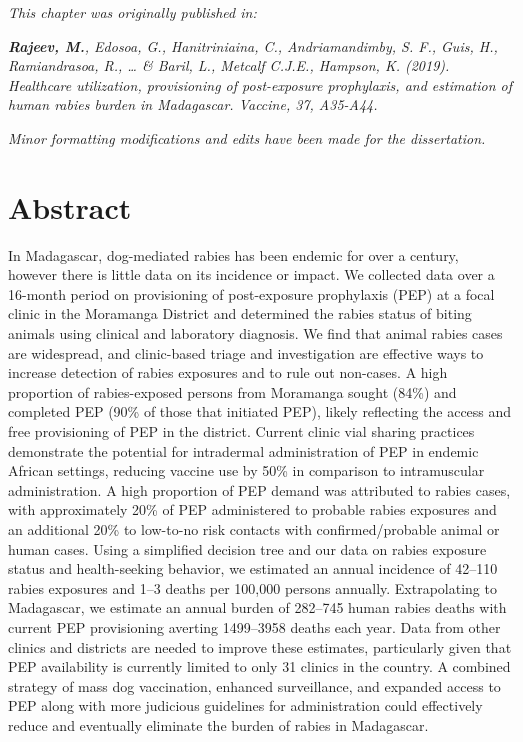 \documentclass[
  oneside]{book}
\begin{document}
\emph{This chapter was originally published in:}

\emph{\textbf{Rajeev, M.}, Edosoa, G., Hanitriniaina, C., Andriamandimby, S. F., Guis, H., Ramiandrasoa, R., \ldots{} \& Baril, L., Metcalf C.J.E., Hampson, K. (2019). Healthcare utilization, provisioning of post-exposure prophylaxis, and estimation of human rabies burden in Madagascar. Vaccine, 37, A35-A44.}

\emph{Minor formatting modifications and edits have been made for the dissertation.}

\newpage

\setlength{\parskip}{2em}

\hypertarget{abstract}{%
\section*{Abstract}\label{abstract}}

In Madagascar, dog-mediated rabies has been endemic for over a century, however there is little data on its incidence or impact. We collected data over a 16-month period on provisioning of post-exposure prophylaxis (PEP) at a focal clinic in the Moramanga District and determined the rabies status of biting animals using clinical and laboratory diagnosis. We find that animal rabies cases are widespread, and clinic-based triage and investigation are effective ways to increase detection of rabies exposures and to rule out non-cases. A high proportion of rabies-exposed persons from Moramanga sought (84\%) and completed PEP (90\% of those that initiated PEP), likely reflecting the access and free provisioning of PEP in the district. Current clinic vial sharing practices demonstrate the potential for intradermal administration of PEP in endemic African settings, reducing vaccine use by 50\% in comparison to intramuscular administration. A high proportion of PEP demand was attributed to rabies cases, with approximately 20\% of PEP administered to probable rabies exposures and an additional 20\% to low-to-no risk contacts with confirmed/probable animal or human cases. Using a simplified decision tree and our data on rabies exposure status and health-seeking behavior, we estimated an annual incidence of 42--110 rabies exposures and 1--3 deaths per 100,000 persons annually. Extrapolating to Madagascar, we estimate an annual burden of 282--745 human rabies deaths with current PEP provisioning averting 1499--3958 deaths each year. Data from other clinics and districts are needed to improve these estimates, particularly given that PEP availability is currently limited to only 31 clinics in the country. A combined strategy of mass dog vaccination, enhanced surveillance, and expanded access to PEP along with more judicious guidelines for administration could effectively reduce and eventually eliminate the burden of rabies in Madagascar.
\end{document}
